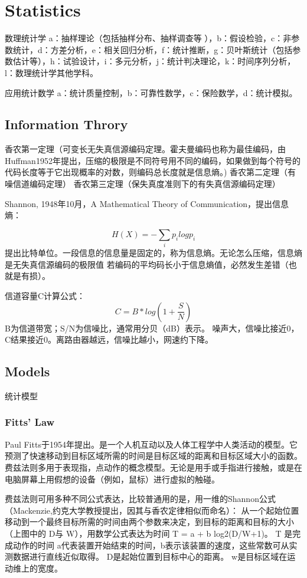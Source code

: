

\chapter{Statistics}


数理统计学
a：抽样理论（包括抽样分布、抽样调查等 ），b：假设检验，c：非参数统计，d：方差分析，e：相关回归分析，f：统计推断，g：贝叶斯统计（包括参数估计等），h：试验设计，i：多元分析，j：统计判决理论，k：时间序列分析，l：数理统计学其他学科。

应用统计数学
a：统计质量控制，b：可靠性数学，c：保险数学，d：统计模拟。



\section{Information Throry}



香农第一定理（可变长无失真信源编码定理。霍夫曼编码也称为最佳编码，由Huffman1952年提出，压缩的极限是不同符号用不同的编码，如果做到每个符号的代码长度等于它出现概率的对数，则编码总长度就是信息熵。)
香农第二定理（有噪信道编码定理）
香农第三定理（保失真度准则下的有失真信源编码定理）

Shannon, 1948年10月，A Mathematical Theory of Communication，提出信息熵：

\begin{equation}
    H(X) = - \sum_i p_i logp_i
\end{equation}
提出比特单位。一段信息的信息量是固定的，称为信息熵。无论怎么压缩，信息熵是无失真信源编码的极限值
若编码的平均码长小于信息熵值，必然发生差错（也就是有损）。


信道容量C计算公式：
\begin{equation}
    C = B * log(1+ \frac{S}{N})
\end{equation}
B为信道带宽；S/N为信噪比，通常用分贝（dB）表示。
噪声大，信噪比接近0，C结果接近0。离路由器越远，信噪比越小，网速约下降。


\section{Models}
统计模型
\subsection{Fitts' Law}
Paul Fitts于1954年提出。是一个人机互动以及人体工程学中人类活动的模型。它预测了快速移动到目标区域所需的时间是目标区域的距离和目标区域大小的函数。费兹法则多用于表现指，点动作的概念模型。无论是用手或手指进行接触，或是在电脑屏幕上用假想的设备（例如，鼠标）进行虚拟的触碰。

费兹法则可用多种不同公式表达，比较普通用的是，用一维的Shannon公式（Mackenzie,约克大学教授提出，因其与香农定律相似而命名）：
从一个起始位置移动到一个最终目标所需的时间由两个参数来决定，到目标的距离和目标的大小（上图中的 D与 W），用数学公式表达为时间 T = a + b log2(D/W+1)。
T 是完成动作的时间
a代表装置开始结束的时间，b表示该装置的速度，这些常数可从实测数据进行直线近似取得。
D是起始位置到目标中心的距离。
w是目标区域在运动维上的宽度。

